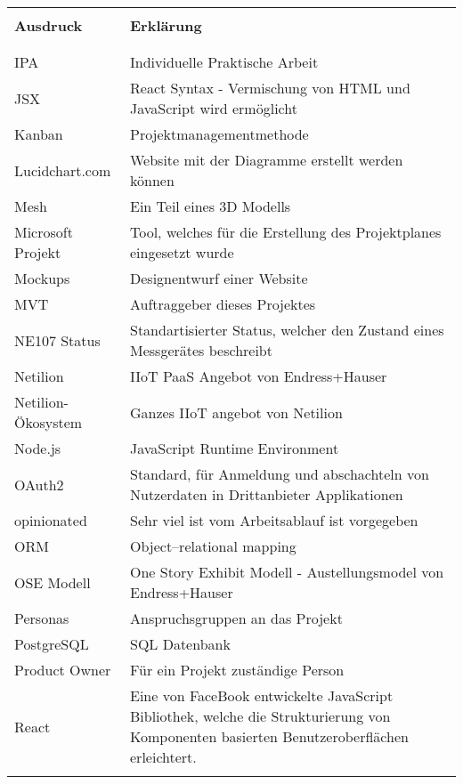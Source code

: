 \begin{table}[H]
  \begin{tabularx}{\textwidth}{l X}\hline \\
  \textbf{Ausdruck} & \textbf{Erklärung}  \\ \\\hline \\
  IPA & Individuelle Praktische Arbeit \\
  JSX & React Syntax - Vermischung von HTML und JavaScript wird ermöglicht \\
  Kanban & Projektmanagementmethode \\
  Lucidchart.com & Website mit der Diagramme erstellt werden können \\
  Mesh & Ein Teil eines 3D Modells \\
  Microsoft Projekt & Tool, welches für die Erstellung des Projektplanes eingesetzt wurde \\
  Mockups & Designentwurf einer Website \\
  MVT & Auftraggeber dieses Projektes \\
  NE107 Status & Standartisierter Status, welcher den Zustand eines Messgerätes beschreibt \\
  Netilion & IIoT PaaS Angebot von Endress+Hauser \\
  Netilion-Ökosystem & Ganzes IIoT angebot von Netilion \\
  Node.js & JavaScript Runtime Environment \\
  OAuth2 & Standard, für Anmeldung und abschachteln von Nutzerdaten in Drittanbieter Applikationen \\
  opinionated & Sehr viel ist vom Arbeitsablauf ist vorgegeben \\
  ORM & Object–relational mapping \\
  OSE Modell & One Story Exhibit Modell - Austellungsmodel von Endress+Hauser \\
  Personas & Anspruchsgruppen an das Projekt \\
  PostgreSQL & SQL Datenbank \\
  Product Owner & Für ein Projekt zuständige Person \\
  React & Eine von FaceBook entwickelte JavaScript Bibliothek, welche die Strukturierung von Komponenten basierten Benutzeroberflächen erleichtert. \\
  \\\hline
  \end{tabularx}
\end{table}
\pagebreak
